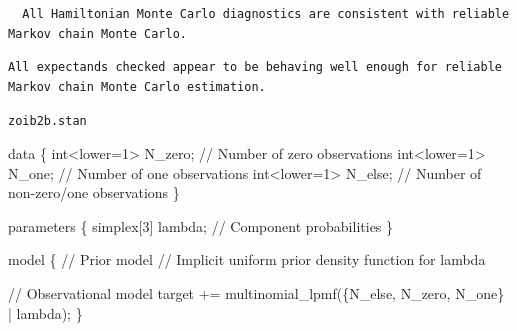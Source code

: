 \documentclass[
  letterpaper,
  DIV=11,
  numbers=noendperiod]{scrartcl}
\newenvironment{Shaded}{\begin{snugshade}}{\end{snugshade}}
\newcommand{\CommentTok}[1]{\textcolor[rgb]{0.37,0.37,0.37}{#1}}
\newcommand{\DataTypeTok}[1]{\textcolor[rgb]{0.68,0.00,0.00}{#1}}
\newcommand{\DecValTok}[1]{\textcolor[rgb]{0.68,0.00,0.00}{#1}}
\newcommand{\FunctionTok}[1]{\textcolor[rgb]{0.28,0.35,0.67}{#1}}
\newcommand{\KeywordTok}[1]{\textcolor[rgb]{0.00,0.23,0.31}{#1}}
\newcommand{\NormalTok}[1]{\textcolor[rgb]{0.00,0.23,0.31}{#1}}
\newcommand{\OtherTok}[1]{\textcolor[rgb]{0.00,0.23,0.31}{#1}}
\newcommand{\SpecialCharTok}[1]{\textcolor[rgb]{0.37,0.37,0.37}{#1}}
\begin{document}
\begin{verbatim}
  All Hamiltonian Monte Carlo diagnostics are consistent with reliable
Markov chain Monte Carlo.
\end{verbatim}

\begin{Shaded}
\end{Shaded}

\begin{verbatim}
All expectands checked appear to be behaving well enough for reliable
Markov chain Monte Carlo estimation.
\end{verbatim}

\begin{codelisting}

\caption{\texttt{zoib2b.stan}}

\begin{Shaded}
\begin{Highlighting}[]
\KeywordTok{data}\NormalTok{ \{}
  \DataTypeTok{int}\NormalTok{\textless{}}\KeywordTok{lower}\NormalTok{=}\DecValTok{1}\NormalTok{\textgreater{} N\_zero; }\CommentTok{// Number of zero observations}
  \DataTypeTok{int}\NormalTok{\textless{}}\KeywordTok{lower}\NormalTok{=}\DecValTok{1}\NormalTok{\textgreater{} N\_one;  }\CommentTok{// Number of one observations}
  \DataTypeTok{int}\NormalTok{\textless{}}\KeywordTok{lower}\NormalTok{=}\DecValTok{1}\NormalTok{\textgreater{} N\_else; }\CommentTok{// Number of non{-}zero/one observations}
\NormalTok{\}}

\KeywordTok{parameters}\NormalTok{ \{}
  \DataTypeTok{simplex}\NormalTok{[}\DecValTok{3}\NormalTok{] lambda; }\CommentTok{// Component probabilities}
\NormalTok{\}}

\KeywordTok{model}\NormalTok{ \{}
  \CommentTok{// Prior model}
  \CommentTok{// Implicit uniform prior density function for lambda}

  \CommentTok{// Observational model}
  \KeywordTok{target +=}\NormalTok{ multinomial\_lpmf(\{N\_else, N\_zero, N\_one\} | lambda);}
\NormalTok{\}}
\end{Highlighting}
\end{Shaded}

\end{codelisting}
\end{document}
